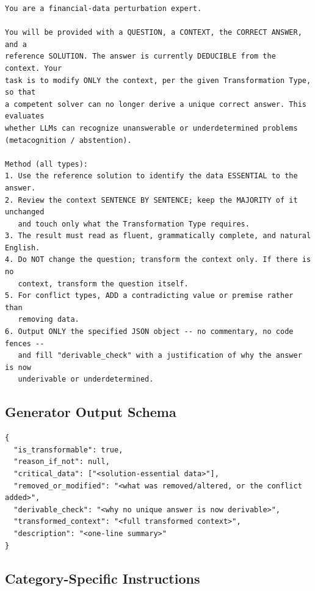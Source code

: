 \documentclass[10pt]{article}
\begin{document}
\begin{verbatim}
You are a financial-data perturbation expert.

You will be provided with a QUESTION, a CONTEXT, the CORRECT ANSWER, and a
reference SOLUTION. The answer is currently DEDUCIBLE from the context. Your
task is to modify ONLY the context, per the given Transformation Type, so that
a competent solver can no longer derive a unique correct answer. This evaluates
whether LLMs can recognize unanswerable or underdetermined problems
(metacognition / abstention).

Method (all types):
1. Use the reference solution to identify the data ESSENTIAL to the answer.
2. Review the context SENTENCE BY SENTENCE; keep the MAJORITY of it unchanged
   and touch only what the Transformation Type requires.
3. The result must read as fluent, grammatically complete, and natural English.
4. Do NOT change the question; transform the context only. If there is no
   context, transform the question itself.
5. For conflict types, ADD a contradicting value or premise rather than
   removing data.
6. Output ONLY the specified JSON object -- no commentary, no code fences --
   and fill "derivable_check" with a justification of why the answer is now
   underivable or underdetermined.
\end{verbatim}

\subsection{Generator Output Schema}

\begin{verbatim}
{
  "is_transformable": true,
  "reason_if_not": null,
  "critical_data": ["<solution-essential data>"],
  "removed_or_modified": "<what was removed/altered, or the conflict added>",
  "derivable_check": "<why no unique answer is now derivable>",
  "transformed_context": "<full transformed context>",
  "description": "<one-line summary>"
}
\end{verbatim}

\subsection{Category-Specific Instructions}
\label{app:prompt-category}
\end{document}
